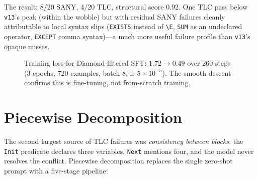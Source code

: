 \documentclass[11pt]{article}
\begin{document}
The result: 8/20 SANY, 4/20 TLC, structural score 0.92.  One TLC
pass below \texttt{v13}'s peak (within the wobble) but with residual
SANY failures cleanly attributable to local syntax slips
(\texttt{EXISTS} instead of \texttt{\textbackslash E}, \texttt{SUM} as
an undeclared operator, \texttt{EXCEPT} comma syntax)---a much more
useful failure profile than \texttt{v13}'s opaque misses.

\begin{figure}[t]
\centering
{}
\caption{Training loss for Diamond-filtered SFT: $1.72 \to 0.49$ over
260 steps (3 epochs, 720 examples, batch 8, lr $5\!\times\!10^{-5}$).
The smooth descent confirms this is fine-tuning, not from-scratch
training.}
\label{fig:loss}
\end{figure}

\section{Piecewise Decomposition}
\label{sec:piecewise}

The second largest source of TLC failures was \emph{consistency
between blocks}: the \texttt{Init} predicate declares three variables,
\texttt{Next} mentions four, and the model never resolves the
conflict.  Piecewise decomposition replaces the single zero-shot
prompt with a five-stage pipeline:
\end{document}
